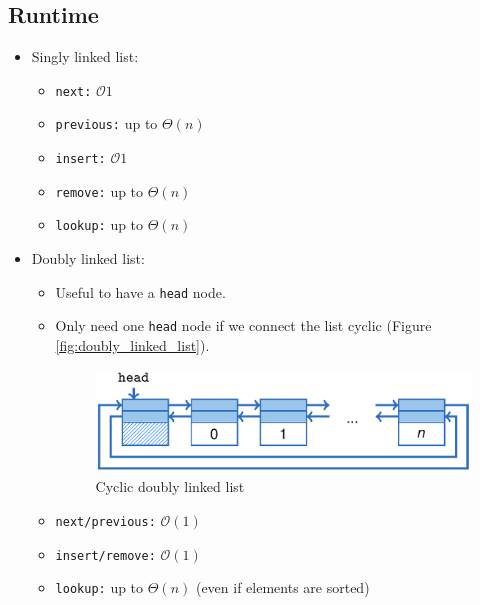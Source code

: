 \documentclass[12pt, a4paper]{scrartcl}
\newcommand{\bigO}{\mathcal{O}}
\newcommand{\imgwidth}{.7\textwidth}
\begin{document}
\subsection{Runtime}
\begin{itemize}
\item Singly linked list:
  \begin{itemize}
  \item \texttt{next:} $\bigO{1} $
  \item \texttt{previous:} up to $\Theta(n)$
  \item \texttt{insert:} $\bigO{1}$
  \item \texttt{remove:} up to $\Theta(n)$
  \item \texttt{lookup:} up to $\Theta(n)$
  \end{itemize}
\item Doubly linked list:
  \begin{itemize}
  \item Useful to have a \texttt{head} node.
  \item Only need one \texttt{head} node if we connect the list cyclic (Figure \ref{fig:doubly_linked_list}).
    \begin{figure}[htbp]
      \centering
      \includegraphics[width=\imgwidth]{cyclic_doubly_linked}
      \caption{Cyclic doubly linked list}
      \label{fig:cyclic_doubly_linked}
    \end{figure}
  \item \texttt{next/previous:} $\bigO(1)$
  \item \texttt{insert/remove:} $\bigO(1)$
  \item \texttt{lookup:} up to $\Theta(n)$ (even if elements are sorted)
  \end{itemize}
\end{itemize}
\end{document}
